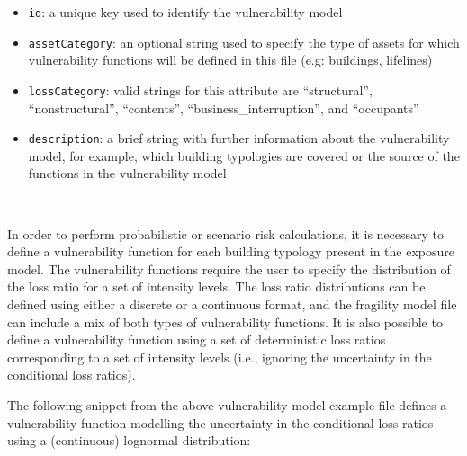\begin{itemize}

    \item \Verb+id+: a unique key used to identify the \gls{vulnerability model}

    \item \Verb+assetCategory+: an optional string used to specify the type of
    \glspl{asset} for which vulnerability functions will be defined in this file 
    (e.g: buildings, lifelines)

    \item \Verb+lossCategory+: valid strings for this attribute are 
    ``structural'', ``nonstructural'', ``contents'',  
    ``business\_interruption'', and ``occupants''

    \item \Verb+description+: a brief string with further information about the
    \gls{vulnerability model}, for example, which building typologies are 
    covered or the source of the functions in the \gls{vulnerability model}

\end{itemize}

\inputminted[firstline=4,firstnumber=4,lastline=8,fontsize=\footnotesize,frame=single,linenos,bgcolor=lightgray]{xml}{oqum/risk/Verbatim/input_vulnerability.xml}\\


In order to perform probabilistic or scenario risk calculations, it is
necessary to define a vulnerability function for each building typology
present in the exposure model. The vulnerability functions require the user to
specify the distribution of the loss ratio for a set of intensity levels. The
loss ratio distributions can be defined using either a discrete or a
continuous format, and the fragility model file can include a mix of both
types of vulnerability functions. It is also possible to define a
vulnerability function using a set of deterministic loss ratios corresponding
to a set of intensity levels (i.e., ignoring the uncertainty in the
conditional loss ratios).

The following snippet from the above vulnerability model example file defines
a vulnerability function modelling the uncertainty in the conditional loss
ratios using a (continuous) lognormal distribution:

\inputminted[firstline=10,firstnumber=10,lastline=14,fontsize=\footnotesize,frame=single,linenos,bgcolor=lightgray]{xml}{oqum/risk/Verbatim/input_vulnerability.xml}\\

